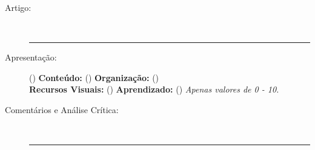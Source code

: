 \documentclass{UnBExam}%
\begin{document}
%
	\begin{description}
		\item[Artigo:] \hrulefill\\\hrule\vspace{1em}%
		\item[\hspace{1.45em}Apresentação:] (\hspace{2.5em}) \hfill%
			\textbf{Conteúdo:} (\hspace{2.5em}) \hfill%
			\textbf{Organização:} (\hspace{2.5em})\\%
			\hspace*{-2.5em}\textbf{Recursos Visuais:} (\hspace{2.5em}) \hspace{4.1em}%
			\textbf{Aprendizado:} (\hspace{2.5em})
			\hfill \emph{Apenas valores de 0 - 10.}\vspace{1em}%
			\item[Comentários e Análise Crítica:] \hrulefill\\\hrule
	\end{description}

    \noindent
    \null\hrulefill\\\null\hrulefill\\\null\hrulefill\\
    \null\hrulefill\\\null\hrulefill\\\null\hrulefill\\
    \null\hrulefill\\\null\hrulefill\\\null\hrulefill\\
    \null\hrulefill\\\null\hrulefill\\\null\hrulefill\\
    \null\hrulefill\\\null\hrulefill\\\null\hrulefill\\
    \null\hrulefill\\\null\hrulefill\\\null\hrulefill\\
    \null\hrulefill\\\null\hrulefill\\\null\hrulefill\\
    \null\hrulefill\\\null\hrulefill\\\null\hrulefill\\
    \null\hrulefill\\\null\hrulefill\\\null\hrulefill\\
    \null\hrulefill\\\null\hrulefill\\\null\hrulefill\\
    \null\hrulefill\\\null\hrulefill\\\null\hrulefill
    \newpage%
\end{document}
